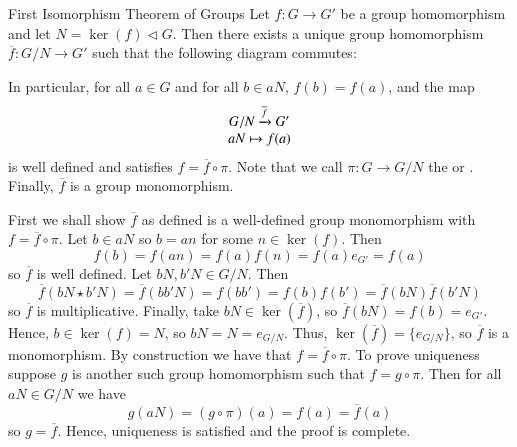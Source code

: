 \documentclass[12pt, a4paper, twoside, openright, titlepage]{book}
\begin{document}
\begin{namthm}{First Isomorphism Theorem of Groups}{}
        Let $f:G\rightarrow G'$ be a group homomorphism and let $N = \ker(f) \vartriangleleft G$. Then there exists a unique group homomorphism $\overline{f}:G/N\rightarrow G'$ such that the following diagram commutes: 
        \begin{center}
        \end{center}
        In particular, for all $a \in G$ and for all $b \in aN$, $f(b) = f(a)$, and the map \begin{equation}
                \begin{array}{c} G/N\xrightarrow{\overline{f}} G' \\ aN\mapsto f(a) \end{array}
        \end{equation}
        is well defined and satisfies $f = \overline{f} \circ \pi$. Note that we call $\pi:G\rightarrow G/N$ the  or . Finally, $\overline{f}$ is a group monomorphism.
\end{namthm}
\begin{proof*}{}{}
        First we shall show $\overline{f}$ as defined is a well-defined group monomorphism with $f = \overline{f} \circ \pi$. Let $b \in aN$ so $b = an$ for some $n \in \ker(f)$. Then $$f(b) = f(an) = f(a)f(n) = f(a)e_{G'} = f(a)$$ so $\overline{f}$ is well defined. Let $bN,b'N \in G/N$. Then $$\overline{f}(bN\star b'N) = \overline{f}(bb'N) = f(bb') = f(b)f(b') = \overline{f}(bN)\overline{f}(b'N)$$ so $\overline{f}$ is multiplicative. Finally, take $bN \in \ker(\overline{f})$, so $\overline{f}(bN) = f(b) = e_{G'}$. Hence, $b \in \ker(f) = N$, so $bN = N = e_{G/N}$. Thus, $\ker(\overline{f}) = \{e_{G/N}\}$, so $\overline{f}$ is a monomorphism. By construction we have that $f = \overline{f}\circ \pi$. To prove uniqueness suppose $g$ is another such group homomorphism such that $f = g\circ \pi$. Then for all $aN \in G/N$ we have $$g(aN) = (g\circ \pi)(a) = f(a) = \overline{f}(a)$$
        so $g = \overline{f}$. Hence, uniqueness is satisfied and the proof is complete.
\end{proof*}
\end{document}

